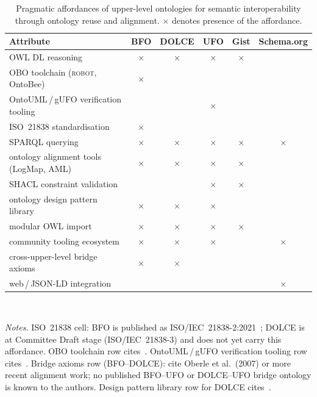 \begin{table}[t]
\caption{Pragmatic affordances of upper-level ontologies for semantic
         interoperability through ontology reuse and alignment.
         $\times$ denotes presence of the affordance.}
\label{tab:upper-pragaff}
\centering
\small
\begin{tabular}{lccccc}
\hline
\textbf{Attribute}
  & \textbf{BFO}
  & \textbf{DOLCE}
  & \textbf{UFO}
  & \textbf{Gist}
  & \textbf{Schema.org} \\
\hline
OWL DL reasoning
  & $\times$ & $\times$ & $\times$ & $\times$ & \\
OBO toolchain (\textsc{robot}, OntoBee)
  & $\times$ & & & & \\
OntoUML\,/\,gUFO verification tooling
  & & & $\times$ & & \\
ISO~21838 standardisation
  & $\times$ & & & & \\
SPARQL querying
  & $\times$ & $\times$ & $\times$ & $\times$ & $\times$ \\
ontology alignment tools (LogMap, AML)
  & $\times$ & $\times$ & $\times$ & $\times$ & \\
SHACL constraint validation
  & & & $\times$ & $\times$ & \\
ontology design pattern library
  & $\times$ & $\times$ & $\times$ & & \\
modular OWL import
  & $\times$ & $\times$ & $\times$ & $\times$ & \\
community tooling ecosystem
  & $\times$ & $\times$ & $\times$ & & $\times$ \\
cross-upper-level bridge axioms
  & $\times$ & $\times$ & & & \\
web\,/\,JSON-LD integration
  & & & & & $\times$ \\
\hline
\end{tabular}
\\[4pt]
\raggedright\footnotesize
\textit{Notes.}
ISO~21838 cell: BFO is published as ISO/IEC~21838-2:2021~\cite{iso21838};
DOLCE is at Committee Draft stage (ISO/IEC~21838-3) and does not yet
carry this affordance.
OBO toolchain row cites~\cite{jackson2019}.
OntoUML\,/\,gUFO verification tooling row cites~\cite{almeida2021}.
Bridge axioms row (BFO--DOLCE): cite Oberle et al.\ (2007) or more
recent alignment work; no published BFO--UFO or DOLCE--UFO bridge
ontology is known to the authors.
Design pattern library row for DOLCE cites~\cite{gangemi2009}.
\end{table}

